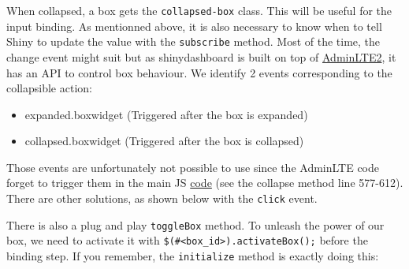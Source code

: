 \documentclass[]{book}
\providecommand{\tightlist}{%
  \setlength{\itemsep}{0pt}\setlength{\parskip}{0pt}}
\begin{document}
When collapsed, a box gets the \texttt{collapsed-box} class. This will be useful for the input binding. As mentionned above, it is also necessary to know when to tell Shiny to update the value with the \texttt{subscribe} method. Most of the time, the change event might suit but as shinydashboard is built on top of \href{https://adminlte.io/docs/2.4/js-box-widget}{AdminLTE2}, it has an API to control box behaviour. We identify 2 events corresponding to the collapsible action:

\begin{itemize}
\tightlist
\item
  expanded.boxwidget (Triggered after the box is expanded)
\item
  collapsed.boxwidget (Triggered after the box is collapsed)
\end{itemize}

Those events are unfortunately not possible to use since the AdminLTE code forget to trigger them in the main JS \href{https://github.com/rstudio/shinydashboard/blob/master/srcjs/AdminLTE/app.js}{code} (see the collapse method line 577-612). There are other solutions, as shown below with the \texttt{click} event.

There is also a plug and play \texttt{toggleBox} method. To unleash the power of our box, we need to activate it with \texttt{\$(\textquotesingle{}\#\textless{}box\_id\textgreater{}\textquotesingle{}).activateBox();} before the binding step. If you remember, the \texttt{initialize} method is exactly doing this:
\end{document}
